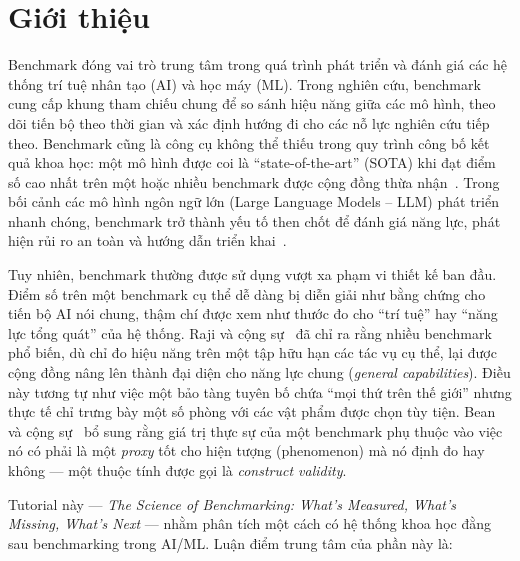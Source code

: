 
\section{Giới thiệu}
\label{sec:introduction}

Benchmark đóng vai trò trung tâm trong quá trình phát triển và đánh giá các hệ thống trí tuệ nhân tạo (AI) và học máy (ML). Trong nghiên cứu, benchmark cung cấp khung tham chiếu chung để so sánh hiệu năng giữa các mô hình, theo dõi tiến bộ theo thời gian và xác định hướng đi cho các nỗ lực nghiên cứu tiếp theo. Benchmark cũng là công cụ không thể thiếu trong quy trình công bố kết quả khoa học: một mô hình được coi là ``state-of-the-art'' (SOTA) khi đạt điểm số cao nhất trên một hoặc nhiều benchmark được cộng đồng thừa nhận~\cite{everything_benchmark}. Trong bối cảnh các mô hình ngôn ngữ lớn (Large Language Models -- LLM) phát triển nhanh chóng, benchmark trở thành yếu tố then chốt để đánh giá năng lực, phát hiện rủi ro an toàn và hướng dẫn triển khai~\cite{measuring_what_matters}.

Tuy nhiên, benchmark thường được sử dụng vượt xa phạm vi thiết kế ban đầu. Điểm số trên một benchmark cụ thể dễ dàng bị diễn giải như bằng chứng cho tiến bộ AI nói chung, thậm chí được xem như thước đo cho ``trí tuệ'' hay ``năng lực tổng quát'' của hệ thống. Raji và cộng sự~\cite{everything_benchmark} đã chỉ ra rằng nhiều benchmark phổ biến, dù chỉ đo hiệu năng trên một tập hữu hạn các tác vụ cụ thể, lại được cộng đồng nâng lên thành đại diện cho năng lực chung (\textit{general capabilities}). Điều này tương tự như việc một bảo tàng tuyên bố chứa ``mọi thứ trên thế giới'' nhưng thực tế chỉ trưng bày một số phòng với các vật phẩm được chọn tùy tiện. Bean và cộng sự~\cite{measuring_what_matters} bổ sung rằng giá trị thực sự của một benchmark phụ thuộc vào việc nó có phải là một \textit{proxy} tốt cho hiện tượng (phenomenon) mà nó định đo hay không --- một thuộc tính được gọi là \textit{construct validity}.

Tutorial này --- \textit{The Science of Benchmarking: What's Measured, What's Missing, What's Next} --- nhằm phân tích một cách có hệ thống khoa học đằng sau benchmarking trong AI/ML. Luận điểm trung tâm của phần này là:

